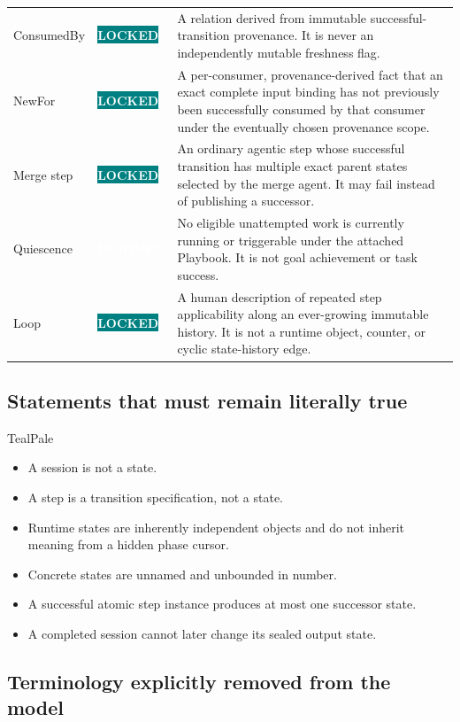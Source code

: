 \documentclass[11pt]{article}
\newcommand{\statuspill}[2]{%
  \begingroup\setlength{\fboxsep}{3pt}%
  \colorbox{#1}{\textcolor{white}{\sffamily\bfseries\scriptsize #2}}%
  \endgroup}
\newcommand{\Locked}{\statuspill{Teal}{LOCKED}}
\newcommand{\Derived}{\statuspill{Accent}{DERIVED}}
\begin{document}
\begin{longtable}{@{}L{1.25in}L{0.78in}L{4.52in}@{}}
ConsumedBy & \Locked & A relation derived from immutable successful-transition provenance. It is never an independently mutable freshness flag. \\
NewFor & \Locked & A per-consumer, provenance-derived fact that an exact complete input binding has not previously been successfully consumed by that consumer under the eventually chosen provenance scope. \\
Merge step & \Locked & An ordinary agentic step whose successful transition has multiple exact parent states selected by the merge agent. It may fail instead of publishing a successor. \\
Quiescence & \Derived & No eligible unattempted work is currently running or triggerable under the attached Playbook. It is not goal achievement or task success. \\
Loop & \Locked & A human description of repeated step applicability along an ever-growing immutable history. It is not a runtime object, counter, or cyclic state-history edge. \\
\bottomrule
\end{longtable}

\subsection{Statements that must remain literally true}

\begin{decisionbox}{TealPale}
\begin{itemize}
  \item A session is not a state.
  \item A step is a transition specification, not a state.
  \item Runtime states are inherently independent objects and do not inherit meaning from a hidden phase cursor.
  \item Concrete states are unnamed and unbounded in number.
  \item A successful atomic step instance produces at most one successor state.
  \item A completed session cannot later change its sealed output state.
\end{itemize}
\end{decisionbox}

\subsection{Terminology explicitly removed from the model}
\end{document}
